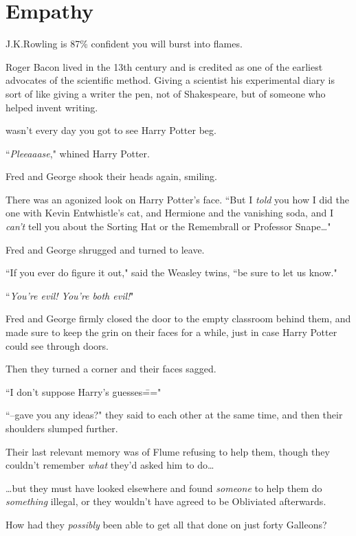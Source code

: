 \chapter{Empathy}

\begin{chapterOpeningAuthorNote}
J.\?K.\?Rowling is 87\% confident you will burst into flames.

Roger Bacon lived in the 13th century and is credited as one of the earliest advocates of the scientific method. Giving a scientist his experimental diary is sort of like giving a writer the pen, not of Shakespeare, but of someone who helped invent writing.
\end{chapterOpeningAuthorNote}

 wasn't every day you got to see Harry Potter beg.

\hplettrineextrapara
``\emph{Pleeaaase}," whined Harry Potter.

Fred and George shook their heads again, smiling.

There was an agonized look on Harry Potter's face. ``But I \emph{told} you how I did the one with Kevin Entwhistle's cat, and Hermione and the vanishing soda, and I \emph{can't} tell you about the Sorting Hat or the Remembrall or Professor Snape{\ldots}"

Fred and George shrugged and turned to leave.

``If you ever do figure it out," said the Weasley twins, ``be sure to let us know."

``\emph{You're evil! You're both evil!}"

Fred and George firmly closed the door to the empty classroom behind them, and made sure to keep the grin on their faces for a while, just in case Harry Potter could see through doors.

Then they turned a corner and their faces sagged.

``I don't suppose Harry's guesses\==="

``\---gave you any ideas?" they said to each other at the same time, and then their shoulders slumped further.

Their last relevant memory was of Flume refusing to help them, though they couldn't remember \emph{what} they'd asked him to do{\ldots}

{\ldots}but they must have looked elsewhere and found \emph{someone} to help them do \emph{something} illegal, or they wouldn't have agreed to be Obliviated afterwards.

How had they \emph{possibly} been able to get all that done on just forty Galleons?

